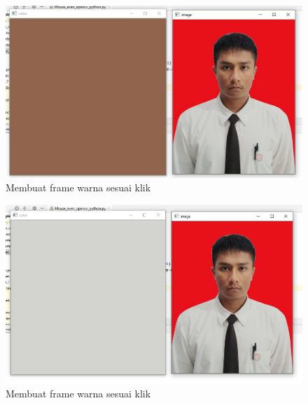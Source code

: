 \newpage
\begin{figure}[ht]
\centering
\includegraphics[scale=0.4]{figures/2,24,1.jpg}
\caption{Membuat frame warna sesuai klik}
\label{contoh}
\end{figure}

\begin{figure}[ht]
\centering
\includegraphics[scale=0.4]{figures/2,24,2.jpg}
\caption{Membuat frame warna sesuai klik}
\label{contoh}
\end{figure}



\newpage
